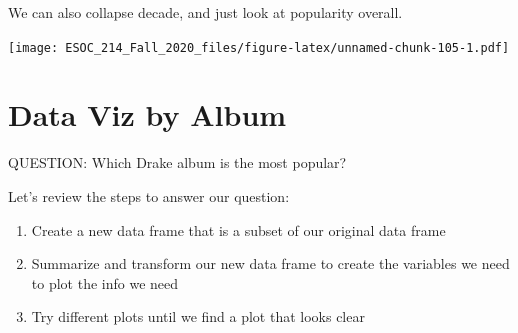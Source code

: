 \documentclass[
]{book}
\newenvironment{Shaded}{\begin{snugshade}}{\end{snugshade}}
\newcommand{\DataTypeTok}[1]{\textcolor[rgb]{0.13,0.29,0.53}{#1}}
\newcommand{\DecValTok}[1]{\textcolor[rgb]{0.00,0.00,0.81}{#1}}
\newcommand{\KeywordTok}[1]{\textcolor[rgb]{0.13,0.29,0.53}{\textbf{#1}}}
\newcommand{\NormalTok}[1]{#1}
\newcommand{\OperatorTok}[1]{\textcolor[rgb]{0.81,0.36,0.00}{\textbf{#1}}}
\newcommand{\StringTok}[1]{\textcolor[rgb]{0.31,0.60,0.02}{#1}}
\begin{document}
We can also collapse decade, and just look at popularity overall.

\begin{Shaded}
\end{Shaded}

\texttt{[image: ESOC\_214\_Fall\_2020\_files/figure-latex/unnamed-chunk-105-1.pdf]}

\hypertarget{data-viz-by-album}{%
\section{Data Viz by Album}\label{data-viz-by-album}}

QUESTION: Which Drake album is the most popular?

Let's review the steps to answer our question:

\begin{enumerate}
\def\labelenumi{\arabic{enumi})}
\item
  Create a new data frame that is a subset of our original data frame
\item
  Summarize and transform our new data frame to create the variables we need to plot the info we need
\item
  Try different plots until we find a plot that looks clear
\end{enumerate}
\end{document}
